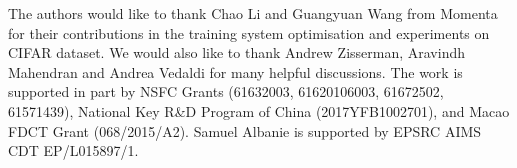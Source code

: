 \documentclass[10pt,journal,compsoc]{IEEEtran}
\begin{document}
The authors would like to thank Chao Li and Guangyuan Wang from Momenta for their contributions in the training system optimisation and experiments on CIFAR dataset. We would also like to thank Andrew Zisserman, Aravindh Mahendran and Andrea Vedaldi for many helpful discussions. The work is supported in part by NSFC Grants (61632003, 61620106003, 61672502, 61571439), National Key R\&D Program of China (2017YFB1002701), and Macao FDCT Grant (068/2015/A2). Samuel Albanie is supported by EPSRC AIMS CDT EP/L015897/1.


\ifCLASSOPTIONcaptionsoff
  \newpage
\fi







%
\end{document}
